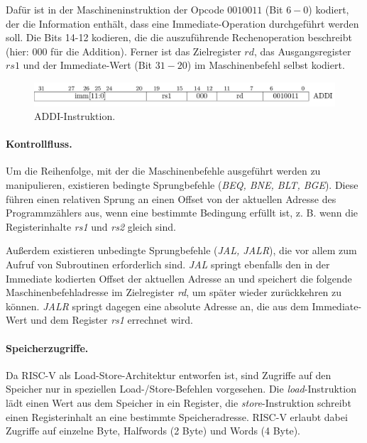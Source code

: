 Dafür ist in der Maschineninstruktion der Opcode $0010011$ (Bit $6 -
0$) kodiert, der die Information enthält, dass eine Immediate-Operation durchgeführt werden soll. Die Bits 14-12 kodieren, die die auszuführende Rechenoperation beschreibt (hier: $000$ für die Addition). Ferner ist das Zielregister $rd$, das Ausgangsregister $rs1$ und der Immediate-Wert (Bit $31 - 20$) im Maschinenbefehl selbst kodiert.

\begin{figure} [ht]
  \centering
  \includegraphics[width=\textwidth]{Figures/ADDI}
  \caption{ADDI-Instruktion.}
  \label{fig:addi}
\end{figure}

\paragraph{Kontrollfluss.}
Um die Reihenfolge, mit der die Maschinenbefehle ausgeführt werden zu
manipulieren, existieren bedingte Sprungbefehle (\textit{BEQ, BNE, BLT,
BGE}). Diese führen einen relativen Sprung an einen Offset von der aktuellen
Adresse des Programmzählers aus, wenn eine bestimmte Bedingung
erfüllt ist, z. B. wenn die Registerinhalte \emph{rs1} und \emph{rs2} gleich sind.

Außerdem existieren unbedingte Sprungbefehle (\textit{JAL, JALR}), die
vor allem zum Aufruf von Subroutinen erforderlich sind. \emph{JAL}
springt ebenfalls den in der Immediate kodierten Offset der aktuellen
Adresse an und speichert
die folgende Maschinenbefehladresse im Zielregister \emph{rd}, um später
wieder zurückkehren zu können. \emph{JALR} springt dagegen eine absolute
Adresse an, die aus dem Immediate-Wert und dem Register \emph{rs1} errechnet wird.

\paragraph{Speicherzugriffe.}
Da RISC-V als Load-Store-Architektur entworfen ist, sind Zugriffe auf den Speicher nur in speziellen Load-/Store-Befehlen vorgesehen. Die \textit{load}-Instruktion lädt einen Wert aus dem Speicher in ein Register, die \textit{store}-Instruktion schreibt einen Registerinhalt an eine bestimmte Speicheradresse. RISC-V erlaubt dabei Zugriffe auf einzelne Byte, Halfwords (2 Byte) und Words (4 Byte).

